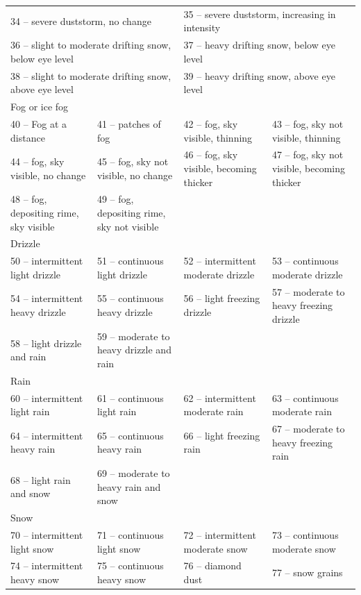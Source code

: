 \documentclass{article}
\begin{document}
\begin{description}
\begin{description}
\begin{landscape}
{\begin{tabular}{llll}
        \multicolumn{2}{l}{34 -- severe duststorm, no change}&\multicolumn{2}{l}{35 -- severe duststorm, increasing in intensity}\\
        \multicolumn{2}{l}{36 -- slight to moderate drifting snow, below eye level}&\multicolumn{2}{l}{37 -- heavy drifting snow, below eye level}\\
        \multicolumn{2}{l}{38 -- slight to moderate drifting snow, above eye level}&\multicolumn{2}{l}{39 -- heavy drifting snow, above eye level}\\
        \multicolumn{4}{l}{Fog or ice fog}\\
        40 -- Fog at a distance&41 -- patches of fog&42 -- fog, sky visible, thinning&43 -- fog, sky not visible, thinning\\
        44 -- fog, sky visible, no change&45 -- fog, sky not visible, no change&46 -- fog, sky visible, becoming thicker&47 -- fog, sky not visible, becoming thicker\\
        48 -- fog, depositing rime, sky visible&49 -- fog, depositing rime, sky not visible& & \\
        \multicolumn{4}{l}{Drizzle}\\
        50 -- intermittent light drizzle&51 -- continuous light drizzle&52 -- intermittent moderate drizzle&53 -- continuous moderate drizzle\\
        54 -- intermittent heavy drizzle&55 -- continuous heavy drizzle&56 -- light freezing drizzle&57 -- moderate to heavy freezing drizzle\\
        58 -- light drizzle and rain&59 -- moderate to heavy drizzle and rain& & \\
        \multicolumn{4}{l}{Rain}\\
        60 -- intermittent light rain&61 -- continuous light rain&62 -- intermittent moderate rain&63 -- continuous moderate rain\\
        64 -- intermittent heavy rain&65 -- continuous heavy rain&66 -- light freezing rain&67 -- moderate to heavy freezing rain\\
        68 -- light rain and snow&69 -- moderate to heavy rain and snow& & \\
        \multicolumn{4}{l}{Snow}\\
        70 -- intermittent light snow&71 -- continuous light snow&72 -- intermittent moderate snow&73 -- continuous moderate snow\\
        74 -- intermittent heavy snow&75 -- continuous heavy snow&76 -- diamond dust&77 -- snow grains\\

\end{tabular}}
\end{landscape}
\end{description}
\end{description}
\end{document}
